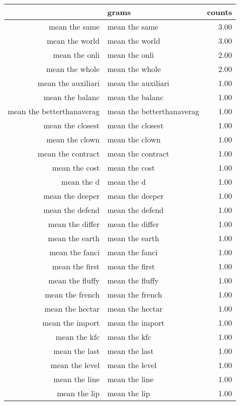 \begin{table}[ht]
\centering
\begin{tabular}{rlr}
  \hline
 & grams & counts \\ 
  \hline
mean the same & mean the same & 3.00 \\ 
  mean the world & mean the world & 3.00 \\ 
  mean the onli & mean the onli & 2.00 \\ 
  mean the whole & mean the whole & 2.00 \\ 
  mean the auxiliari & mean the auxiliari & 1.00 \\ 
  mean the balanc & mean the balanc & 1.00 \\ 
  mean the betterthanaverag & mean the betterthanaverag & 1.00 \\ 
  mean the closest & mean the closest & 1.00 \\ 
  mean the clown & mean the clown & 1.00 \\ 
  mean the contract & mean the contract & 1.00 \\ 
  mean the cost & mean the cost & 1.00 \\ 
  mean the d & mean the d & 1.00 \\ 
  mean the deeper & mean the deeper & 1.00 \\ 
  mean the defend & mean the defend & 1.00 \\ 
  mean the differ & mean the differ & 1.00 \\ 
  mean the earth & mean the earth & 1.00 \\ 
  mean the fanci & mean the fanci & 1.00 \\ 
  mean the first & mean the first & 1.00 \\ 
  mean the fluffy & mean the fluffy & 1.00 \\ 
  mean the french & mean the french & 1.00 \\ 
  mean the hectar & mean the hectar & 1.00 \\ 
  mean the import & mean the import & 1.00 \\ 
  mean the kfc & mean the kfc & 1.00 \\ 
  mean the last & mean the last & 1.00 \\ 
  mean the level & mean the level & 1.00 \\ 
  mean the line & mean the line & 1.00 \\ 
  mean the lip & mean the lip & 1.00 \\ 

\end{tabular}
\end{table}
